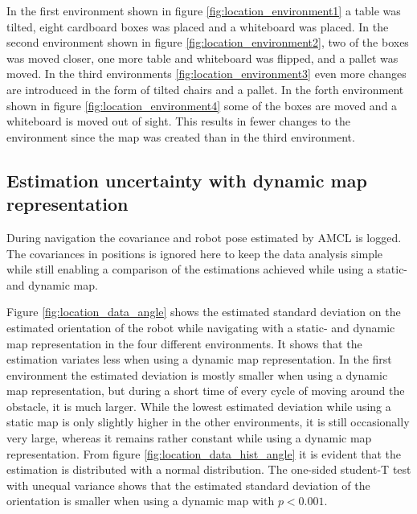 In the first environment shown in figure \ref{fig:location_environment1} a table was tilted, eight cardboard boxes was placed and a whiteboard was placed. 
In the second environment shown in figure \ref{fig:location_environment2}, two of the boxes was moved closer, one more table and whiteboard was flipped, and a pallet was moved. 
In the third environments \ref{fig:location_environment3} even more changes are introduced in the form of tilted chairs and a pallet. 
In the forth environment shown in figure \ref{fig:location_environment4} some of the boxes are moved and a whiteboard is moved out of sight. 
This results in fewer changes to the environment since the map was created than in the third environment.

\subsection{Estimation uncertainty with dynamic map representation}
During navigation the covariance and robot pose estimated by AMCL is logged. 
The covariances in positions is ignored here to keep the data analysis simple while still enabling a comparison of the estimations achieved while using a static- and dynamic map.

Figure \ref{fig:location_data_angle} shows the estimated standard deviation on the estimated orientation of the robot while navigating with a static- and dynamic map representation in the four different environments.
It shows that the estimation variates less when using a dynamic map representation.
In the first environment the estimated deviation is mostly smaller when using a dynamic map representation, but during a short time of every cycle of moving around the obstacle, it is much larger. 
While the lowest estimated deviation while using a static map is only slightly higher in the other environments, it is still occasionally very large, whereas it remains rather constant while using a dynamic map representation. 
From figure \ref{fig:location_data_hist_angle} it is evident that the estimation is distributed with a normal distribution.
The one-sided student-T test with unequal variance shows that the estimated standard deviation of the orientation is smaller when using a dynamic map with $p < 0.001$.

